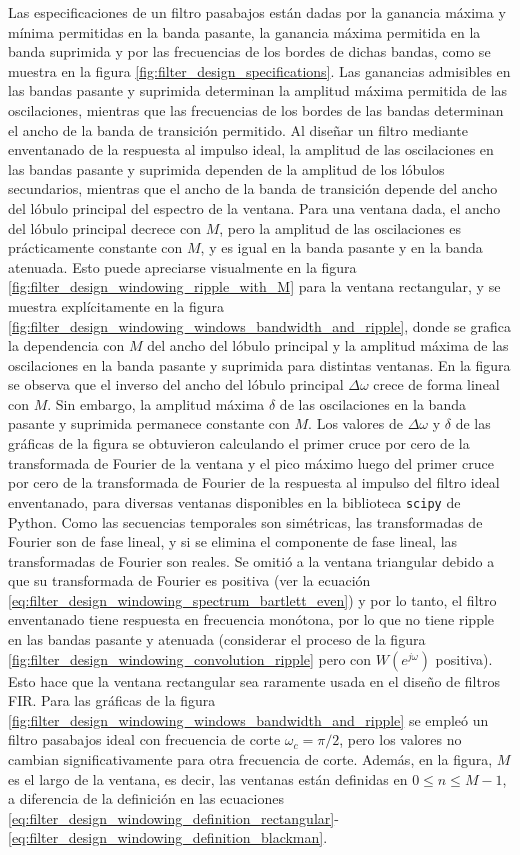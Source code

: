 \documentclass[a4paper]{report}
\begin{document}
Las especificaciones de un filtro pasabajos están dadas por la ganancia máxima y mínima permitidas en la banda pasante, la ganancia máxima permitida en la banda suprimida y por las frecuencias de los bordes de dichas bandas, como se muestra en la figura \ref{fig:filter_design_specifications}. Las ganancias admisibles en las bandas pasante y suprimida determinan la amplitud máxima permitida de las oscilaciones, mientras que las frecuencias de los bordes de las bandas determinan el ancho de la banda de transición permitido. Al diseñar un filtro mediante enventanado de la respuesta al impulso ideal, la amplitud de las oscilaciones en las bandas pasante y suprimida dependen de la amplitud de los lóbulos secundarios, mientras que el ancho de la banda de transición depende del ancho del lóbulo principal del espectro de la ventana. Para una ventana dada, el ancho del lóbulo principal decrece con \(M\), pero la amplitud de las oscilaciones es prácticamente constante con \(M\), y es igual en la banda pasante y en la banda atenuada. Esto puede apreciarse visualmente en la figura \ref{fig:filter_design_windowing_ripple_with_M} para la ventana rectangular, y se muestra explícitamente en la figura \ref{fig:filter_design_windowing_windows_bandwidth_and_ripple}, donde se grafica la dependencia con \(M\) del ancho del lóbulo principal y la amplitud máxima de las oscilaciones en la banda pasante y suprimida para distintas ventanas. En la figura se observa que el inverso del ancho del lóbulo principal \(\Delta\omega\) crece de forma lineal con \(M\). Sin embargo, la amplitud máxima \(\delta\) de las oscilaciones en la banda pasante y suprimida permanece constante con \(M\). Los valores de \(\Delta\omega\) y \(\delta\) de las gráficas de la figura se obtuvieron calculando el primer cruce por cero de la transformada de Fourier de la ventana y el pico máximo luego del primer cruce por cero de la transformada de Fourier de la respuesta al impulso del filtro ideal enventanado, para diversas ventanas disponibles en la biblioteca \texttt{scipy} de Python. Como las secuencias temporales son simétricas, las transformadas de Fourier son de fase lineal, y si se elimina el componente de fase lineal, las transformadas de Fourier son reales. Se omitió a la ventana triangular debido a que su transformada de Fourier es positiva (ver la ecuación \ref{eq:filter_design_windowing_spectrum_bartlett_even}) y por lo tanto, el filtro enventanado tiene respuesta en frecuencia monótona, por lo que no tiene ripple en las bandas pasante y atenuada (considerar el proceso de la figura \ref{fig:filter_design_windowing_convolution_ripple} pero con \(W(e^{j\omega})\) positiva). Esto hace que la ventana rectangular sea raramente usada en el diseño de filtros FIR. Para las gráficas de la figura \ref{fig:filter_design_windowing_windows_bandwidth_and_ripple} se empleó un filtro pasabajos ideal con frecuencia de corte \(\omega_c=\pi/2\), pero los valores no cambian significativamente para otra frecuencia de corte. Además, en la figura, \(M\) es el largo de la ventana, es decir, las ventanas están definidas en \(0\leq n\leq M-1\), a diferencia de la definición en las ecuaciones \ref{eq:filter_design_windowing_definition_rectangular}-\ref{eq:filter_design_windowing_definition_blackman}.
\end{document}
